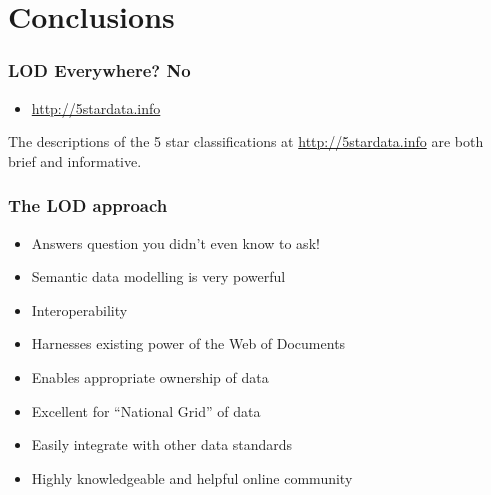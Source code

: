 \section{Conclusions}
\frame
{
  \frametitle{LOD Everywhere? No}
  \begin{center}
  \end{center}
  \begin{itemize}
    \item \url{http://5stardata.info}
  \end{itemize}
}
The descriptions of the 5 star classifications at \url{http://5stardata.info} are both brief and informative.
\frame
{
  \frametitle{The LOD approach}
  \begin{itemize}
    \item Answers question you didn't even know to ask!
    \item Semantic data modelling is very powerful
    \item Interoperability
    \item Harnesses existing power of the Web of Documents
    \item Enables appropriate ownership of data
    \item Excellent for ``National Grid'' of data
    \item Easily integrate with other data standards
    \item Highly knowledgeable and helpful online community
  \end{itemize}
}
